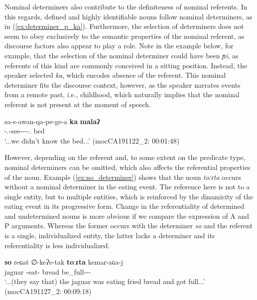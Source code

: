 \documentclass[12pt]{article}
\begin{document}
Nominal determiners also contribute to the definiteness of nominal referents. In this regards, defined and highly identifiable nouns follow  nominal determiners, as in (\ref{ex:determiner_p_ka}). Furthermore, the selection of determiners does not seem to obey exclusively to the semantic properties of the nominal referent, as discourse factors also appear to play a role. Note in the example below, for example, that the selection of the nominal determiner could have been \textit{ɲi}, as referents of this kind are commonly conceived in a sitting position. Instead, the speaker selected \textit{ka}, which encodes absence of the referent. This nominal determiner fits the discourse context, however, as the speaker narrates events from a remote past, i.e., childhood, which naturally implies that the nominal referent is not present at the moment of speech.   

\begin{exe}
\ex \label{ex:determiner_p_ka}
\gll sa-s-awan-qa-pe-ge-a \textbf{ka} \textbf{malaʔ} \\
{\Neg}-{\First.\II}-see-{\Pl}-{\Prog}-{\LocThree}-{\Obj.\Arg} {\DetOne} bed \\
\trans `...we didn't know the bed...' \hfill(mocCA191122\_2: 00:01:48) 
\end{exe}

However, depending on the referent and, to some extent on the predicate type, nominal determiners can be omitted, which also affects the referential properties of the noun. Example (\ref{ex:no_determiner}) shows that the noun \textit{toːɾta} occurs without a nominal determiner in the eating event. The reference here is not to a single entity, but to multiple entities, which is reinforced by the dinamicity of the eating event in its progressive form. Change in the referentiality of determined and undetermined nouns is more obvious if we compare the expression of A and P arguments. Whereas the former occurs with the determiner \textit{so} and the referent is a single, individualized entity, the latter lacks a determiner and its referentiality is less individualized.
 
\begin{exe}
\ex \label{ex:no_determiner}
\gll \textbf{so} ɾeɢat ∅-keʔe-tak \textbf{toːɾta}{\Sploan}  kemaɾ-aɢa-j\\
{\DetTwo} jaguar {\Third\II}-eat-{\Prog} bread be\_full-{\Nmlz}-{\Attr}-{\F}\\
\trans `...(they say that) the jaguar was eating fried bread and got full...'
\trans \hfill (mocCA191127\_2: 00:09:18)
\end{exe}
\end{document}
